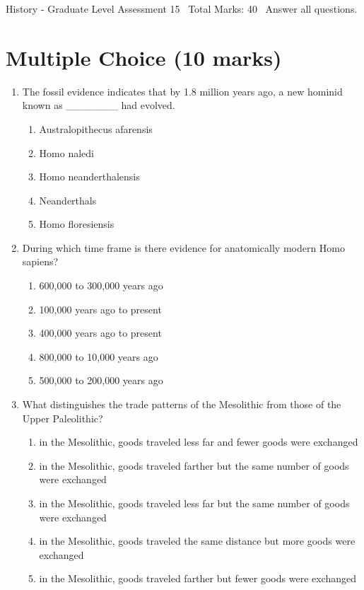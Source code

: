 \documentclass[12pt]{article}
\begin{document}
\begin{center}
History - Graduate Level Assessment 15 \
Total Marks: 40 \
Answer all questions.
\end{center}

\section*{Multiple Choice (10 marks)}
\begin{enumerate}[label=\arabic*.]
\item The fossil evidence indicates that by 1.8 million years ago, a new hominid known as \_\_\_\_\_\_\_ had evolved.
\begin{enumerate}[label=(\alph*)]
    \item Australopithecus afarensis
    \item Homo naledi
    \item Homo neanderthalensis
    \item Neanderthals
    \item Homo floresiensis
\end{enumerate}
\item During which time frame is there evidence for anatomically modern Homo sapiens?
\begin{enumerate}[label=(\alph*)]
    \item 600,000 to 300,000 years ago
    \item 100,000 years ago to present
    \item 400,000 years ago to present
    \item 800,000 to 10,000 years ago
    \item 500,000 to 200,000 years ago
\end{enumerate}
\item What distinguishes the trade patterns of the Mesolithic from those of the Upper Paleolithic?
\begin{enumerate}[label=(\alph*)]
    \item in the Mesolithic, goods traveled less far and fewer goods were exchanged
    \item in the Mesolithic, goods traveled farther but the same number of goods were exchanged
    \item in the Mesolithic, goods traveled less far but the same number of goods were exchanged
    \item in the Mesolithic, goods traveled the same distance but more goods were exchanged
    \item in the Mesolithic, goods traveled farther but fewer goods were exchanged

\end{enumerate}
\end{enumerate}
\end{document}
